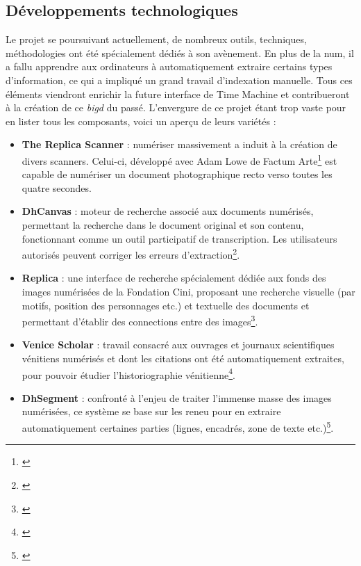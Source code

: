 \subsection{Développements technologiques}
Le projet se poursuivant actuellement, de nombreux outils, techniques, méthodologies ont été spécialement dédiés à son avènement. En plus de la \gls{num}, il a fallu apprendre aux ordinateurs à automatiquement extraire certains types d'information, ce qui a impliqué un grand travail d'indexation manuelle. Tous ces éléments viendront enrichir la future interface de Time Machine et contribueront à la création de ce \textit{\gls{bigd}} du passé. L'envergure de ce projet étant trop vaste pour en lister tous les composants, voici un aperçu de leurs variétés :

\begin{itemize}
\item \textbf{The Replica Scanner} : numériser massivement a induit à  la création de divers scanners. Celui-ci, développé avec Adam Lowe de Factum Arte\footnote{\cite{s.l_factum_nodate}} est capable de numériser un document photographique recto verso toutes les quatre secondes.
\item \textbf{DhCanvas} : moteur de recherche associé aux documents numérisés, permettant la recherche dans le document original et son contenu,  fonctionnant comme un outil participatif de transcription. Les utilisateurs autorisés peuvent corriger les erreurs d'extraction\footnote{\cite{evangelista_time_2018}}.
\item \textbf{Replica} : une interface de recherche spécialement dédiée aux fonds des images numérisées de la Fondation Cini, proposant une recherche visuelle (par motifs, position des personnages etc.) et textuelle des documents et permettant d'établir des connections entre des images\footnote{\cite{evangelista_time_2018}}.
\item \textbf{Venice Scholar} : travail consacré aux ouvrages et journaux scientifiques vénitiens numérisés et dont les citations ont été automatiquement extraites, pour pouvoir étudier l'historiographie vénitienne\footnote{\cite{evangelista_time_2018}}.
\item \textbf{DhSegment} : confronté à l'enjeu de traiter l'immense masse des images numérisées, ce système se base sur les \gls{reneu} pour en extraire automatiquement certaines parties (lignes, encadrés, zone de texte etc.)\footnote{\cite{epfl.dhlab_introduction_nodate}}.
\end{itemize}

